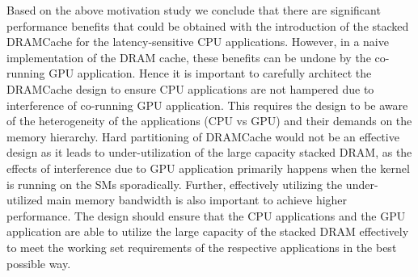 Based on the above motivation study we conclude that there are significant performance benefits that could be obtained 
with the introduction of the stacked DRAMCache for the latency-sensitive CPU applications. However, in a naive implementation
of the DRAM cache, these benefits can be undone by the co-running GPU application.  Hence it is important to carefully 
architect the DRAMCache design to ensure CPU applications are not hampered due to interference of co-running GPU application.
This requires the design to be aware of the heterogeneity of the applications (CPU vs GPU) and their demands on the 
memory hierarchy.  Hard partitioning of DRAMCache would not be an effective design as it leads to under-utilization of the large capacity 
stacked DRAM, as the effects of interference due to GPU application primarily happens when the kernel is running on the SMs sporadically. 
Further, effectively utilizing the under-utilized main memory bandwidth \cite{micro-refresh, mainak-hpca}
is also important to achieve higher performance.  The design should ensure that the CPU applications and the 
GPU application are able to utilize the large capacity of the stacked DRAM effectively to meet the working set 
requirements of the respective applications in the best possible way.
